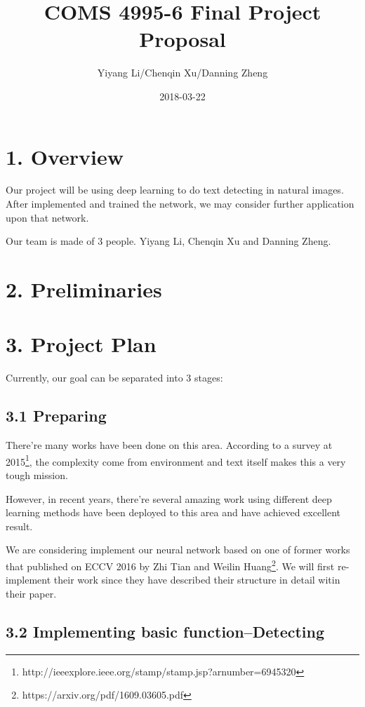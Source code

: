 \documentclass[]{article}
\title{COMS 4995-6 Final Project Proposal}
\author{Yiyang Li/Chenqin Xu/Danning Zheng}
\date{2018-03-22}
\begin{document}
\maketitle

\newcommand\E{\mathbb{E}}
\renewcommand\P{\mathbb{P}}
\newcommand\R{\mathbb{R}}
\newcommand\Var{\operatorname{Var}}

\section{1. Overview}

Our project will be using deep learning to do text detecting in natural images. After implemented and trained the network, we may consider further application upon that network.

Our team is made of 3 people. Yiyang Li, Chenqin Xu and Danning Zheng.

\section{2. Preliminaries}


\section{3. Project Plan}

Currently, our goal can be separated into 3 stages:

\subsection{3.1 Preparing}

There're many works have been done on this area. According to a survey at 2015\footnote{http://ieeexplore.ieee.org/stamp/stamp.jsp?arnumber=6945320}, the complexity come from environment and text itself makes this a very tough mission.

However, in recent years, there're several amazing work using different deep learning methods have been deployed to this area and have achieved excellent result.

We are considering implement our neural network based on one of former works that published on ECCV 2016 by Zhi Tian and Weilin Huang\footnote{https://arxiv.org/pdf/1609.03605.pdf}. We will first re-implement their work since they have described their structure in detail witin their paper. 


\subsection{3.2 Implementing basic function--Detecting}
\end{document}
